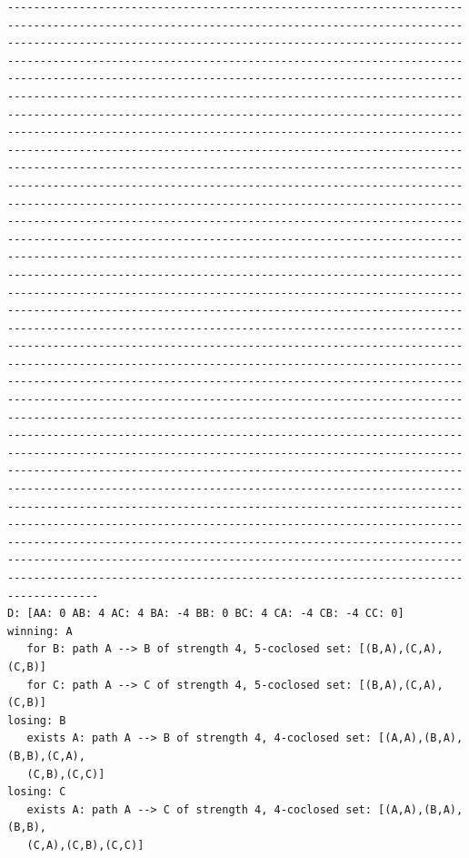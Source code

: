 \documentclass{llncs}
\begin{document}
\begin{lstlisting}[frame=single,basicstyle=\ttfamily\footnotesize]
--------------------------------------------------------------------------------------------------------------------------------------------------------------------------------------------------------------------------------------------------------------------------------------------------------------------------------------------------------------------------------------------------------------------------------------------------------------------------------------------------------------------------------------------------------------------------------------------------------------------------------------------------------------------------------------------------------------------------------------------------------------------------------------------------------------------------------------------------------------------------------------------------------------------------------------------------------------------------------------------------------------------------------------------------------------------------------------------------------------------------------------------------------------------------------------------------------------------------------------------------------------------------------------------------------------------------------------------------------------------------------------------------------------------------------------------------------------------------------------------------------------------------------------------------------------------------------------------------------------------------------------------------------------------------------------------------------------------------------------------------------------------------------------------------------------------------------------------------------------------------------------------------------------------------------------------------------------------------------------------------------------------------------------------------------------------------------------------------------------------------------------------------------------------------------------------------------------------------------------------------------------------------------------------------------------------------------------------------------------------------------------------------------------------
D: [AA: 0 AB: 4 AC: 4 BA: -4 BB: 0 BC: 4 CA: -4 CB: -4 CC: 0]
winning: A
   for B: path A --> B of strength 4, 5-coclosed set: [(B,A),(C,A),(C,B)]
   for C: path A --> C of strength 4, 5-coclosed set: [(B,A),(C,A),(C,B)] 
losing: B
   exists A: path A --> B of strength 4, 4-coclosed set: [(A,A),(B,A),(B,B),(C,A),
   (C,B),(C,C)]
losing: C
   exists A: path A --> C of strength 4, 4-coclosed set: [(A,A),(B,A),(B,B),
   (C,A),(C,B),(C,C)]

\end{lstlisting}
\end{document}
